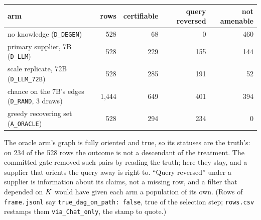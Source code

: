 \begin{medido}
\begin{center}
\small
\begin{tabular}{@{}lrrrr@{}}
\toprule
arm & rows & certifiable & query reversed & not amenable \\
\midrule
no knowledge (\texttt{D\_DEGEN}) & 528 & 68 & 0 & 460 \\
primary supplier, 7B (\texttt{D\_LLM}) & 528 & 229 & 155 & 144 \\
scale replicate, 72B (\texttt{D\_LLM\_72B}) & 528 & 285 & 191 & 52 \\
chance on the 7B's edges (\texttt{D\_RAND}, 3 draws) & 1,444 & 649 & 401 & 394 \\
\midrule
greedy recovering set (\texttt{A\_ORACLE}) & 528 & 294 & 234 & 0 \\
\bottomrule
\end{tabular}
\end{center}
\end{medido}

The oracle arm's graph is fully oriented and true, so its statuses are the truth's: on 234 of the 528
rows the outcome is not a descendant of the treatment. The committed gate removed such pairs by
reading the truth; here they stay, and a supplier that orients the query away is right to. ``Query
reversed'' under a supplier is information about its claims, not a missing row, and a filter that
depended on $K$ would have given each arm a population of its own. (Rows of
\texttt{frame.jsonl} say \texttt{true\_dag\_on\_path: false}, true of the selection step;
\texttt{rows.csv} restamps them \texttt{via\_Chat\_only}, the stamp to quote.)



\begin{antes}
\end{antes}

